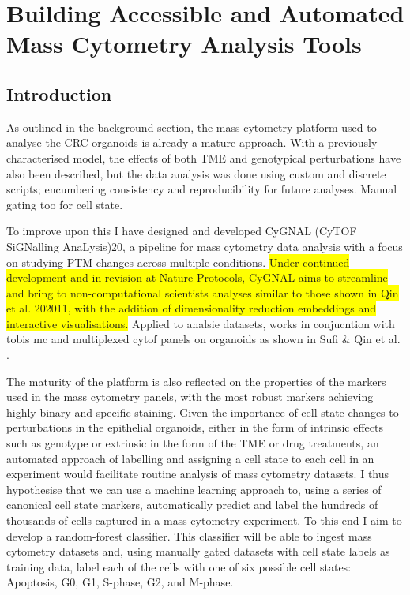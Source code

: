 \chapter{Building Accessible and Automated Mass Cytometry Analysis Tools}
\label{03cytof}

\section{Introduction}


As outlined in the background section, the mass cytometry platform used to analyse the CRC organoids is already a mature approach. With a previously characterised model, the effects of both TME and genotypical perturbations have also been described, but the data analysis was done using custom and discrete scripts; encumbering consistency and reproducibility for future analyses. Manual gating too for cell state.

To improve upon this I have designed and developed CyGNAL (CyTOF SiGNalling AnaLysis)20, a pipeline for mass cytometry data analysis with a focus on studying PTM changes across multiple conditions. 
\colorbox{yellow}{Under continued development and in revision at Nature Protocols, CyGNAL aims to streamline and bring to non-computational scientists analyses similar to those shown in Qin et al. 202011, with the addition of dimensionality reduction embeddings and interactive visualisations.}
Applied to analsie datasets, works in conjucntion with tobis mc and multiplexed cytof panels on organoids as shown in Sufi \& Qin et al. \cite{sufi_multiplexed_2021}.

The maturity of the platform is also reflected on the properties of the markers used in the mass cytometry panels, with the most robust markers achieving highly binary and specific staining. Given the importance of cell state changes to perturbations in the epithelial organoids, either in the form of intrinsic effects such as genotype or extrinsic in the form of the TME or drug treatments, an automated approach of labelling and assigning a cell state to each cell in an experiment would facilitate routine analysis of mass cytometry datasets. 
I thus hypothesise that we can use a machine learning approach to, using a series of canonical cell state markers, automatically predict and label the hundreds of thousands of cells captured in a mass cytometry experiment. To this end I aim to develop a random-forest classifier. This classifier will be able to ingest mass cytometry datasets and, using manually gated datasets with cell state labels as training data, label each of the cells with one of six possible cell states: Apoptosis, G0, G1, S-phase, G2, and M-phase. 

